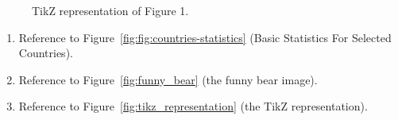 \documentclass[12pt]{scrartcl}
\begin{document}
    \begin{figure}[h]
        \centering
        \caption{TikZ representation of Figure 1.}
        \label{fig:Figure_1}
    \end{figure}
\clearpage
{}
    \centering
    \cite{DBLP:journals/ijcip/HeinrichGAK23}
    \cite{DBLP:conf/eurocrypt/Groth16}
\clearpage
{}
    \begin{enumerate}
        \item Reference to Figure~\ref{fig:fig:countries-statistics} (Basic Statistics For Selected Countries).
        \item Reference to Figure~\ref{fig:funny_bear} (the funny bear image).
        \item Reference to Figure~\ref{fig:tikz_representation} (the TikZ representation).
    \end{enumerate}


\cite{s2011}





\end{document}
